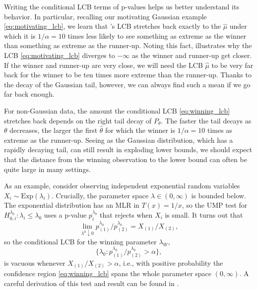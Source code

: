 \documentclass{article}
\begin{document}
Writing the conditional LCB terms of p-values helps us better understand its behavior. In particular, recalling our motivating Gaussian example \eqref{eq:motivating_lcb}, we learn that 's LCB stretches back exactly to the $\hat{\mu}$ under which it is $1/\alpha = 10$ times less likely to see something as extreme as the winner than something as extreme as the runner-up. Noting this fact,  illustrates why the LCB \eqref{eq:motivating_lcb} diverges to $-\infty$ as the winner and runner-up get closer. If the winner and runner-up are very close, we will need the LCB $\hat{\mu}$ to be very far back for the winner to be ten times more extreme than the runner-up. Thanks to the decay of the Gaussian tail, however, we can always find such a mean if we go far back enough. 

For non-Gaussian data, the amount the conditional LCB \eqref{eq:winning_lcb} stretches back depends on the right tail decay of $P_{\theta}$. The faster the tail decays as $\theta$ decreases, the larger the first $\hat{\theta}$ for which the winner is $1/\alpha = 10$ times as extreme as the runner-up. Seeing as the Gaussian distribution, which has a rapidly decaying tail, can still result in exploding lower bounds, we should expect that the distance from the winning observation to the lower bound can often be quite large in many settings.  

As an example, consider observing independent exponential random variables $X_i \sim \text{Exp}(\lambda_i)$. Crucially, the parameter space $\lambda \in (0, \infty)$ is bounded below. The exponential distribution has an MLR in $T(x) = 1/x$, so the UMP test for $H^{\lambda_0}_{0, i}: \lambda_i \leq \lambda_0$ uses a p-value $p^{\lambda_0}_i$ that rejects when $X_i$ is small. It turns out that 
\begin{equation*}
    \lim_{\lambda^0 \downarrow 0} p^{\lambda_0}_{(1)}/p^{\lambda_0}_{(2)} = X_{(1)}/X_{(2)},
\end{equation*}   
so the conditional LCB for the winning parameter $\lambda_W$,
\begin{equation}
\label{eq:exp_winning_lcb}
 \{\lambda_0 : p^{\lambda_0}_{(1)}/p^{\lambda_0}_{(2)}  > \alpha\},
\end{equation}
is vacuous whenever $X_{(1)}/X_{(2)} > \alpha$, i.e., with positive probability the confidence region \eqref{eq:winning_lcb} spans the whole parameter space $(0, \infty)$. A careful derivation of this test and result can be found in . 
\end{document}
